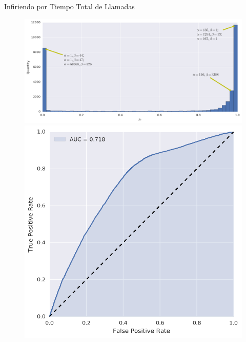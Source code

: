 \documentclass[usenames,dvipsnames,table]{beamer}
\begin{document}
\begin{frame}{Infiriendo por Tiempo Total de Llamadas}

	\begin{figure}
		\includegraphics[width=\framewidth, height=.37\textheight, keepaspectratio]{bayes/hist_time.png} \\
		\includegraphics[width=.49\framewidth, height=.37\textheight, keepaspectratio]{bayes/roc_time.png}

\end{figure}
\end{frame}
\end{document}
